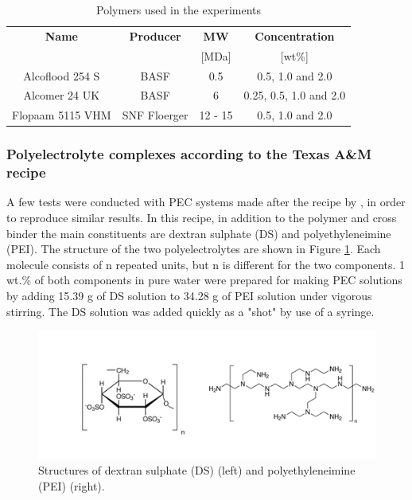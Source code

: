\begin{table} 

\centering
\caption{Polymers used in the experiments}
\label{tab:crGels} %
\begin{tabular}{c c c c } 
\toprule
\textbf{Name} & \textbf{Producer} & \textbf{MW} & \textbf{Concentration} \\ 
&& [MDa] & [wt\%]   \\
\midrule 
Alcoflood 254 S     & BASF    & 0.5 & 0.5, 1.0 and 2.0\\
Alcomer 24 UK       & BASF    & 6 & 0.25, 0.5, 1.0 and 2.0  \\ 
Flopaam 5115 VHM    & SNF Floerger    & 12 - 15 & 0.5, 1.0 and 2.0  \\ 

\bottomrule
\end{tabular}
\end{table}

\subsubsection{Polyelectrolyte complexes according to the Texas A\&M recipe}
A few tests were conducted with PEC systems made after the recipe by \cite{Johnson2010}, in order to reproduce similar results. In this recipe, in addition to the polymer and cross binder  the main constituents are dextran sulphate (DS)  and polyethyleneimine (PEI). The structure of the two polyelectrolytes are shown in Figure \ref{fig:pei}. Each molecule consists of n repeated units, but n is different for the two components. 1 wt.\% of both components in pure water were prepared for making PEC solutions by adding 15.39 g of DS solution to 34.28 g of PEI solution under vigorous stirring. The DS solution was added quickly as a "shot" by use of a syringe.

\begin{figure}[h]
    \centering
    \includegraphics[width=\textwidth]{img/fig/pei.png}
    \caption{Structures of dextran sulphate (DS) (left) and polyethyleneimine (PEI) (right).}
    \label{fig:pei}
\end{figure}
 
